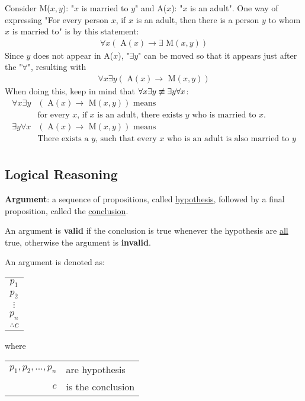 \documentclass{article}
\begin{document}
Consider M($x, y$): "$x$ is married to $y$" and A($x$): "$x$ is an adult".
One way of expressing "For every person $x$, if $x$ is an adult, then
there is a person $y$ to whom $x$ is married to" is by this statement:
\begin{align*}
  \forall x (\text{ A}(x) \rightarrow \exists \text{ M}(x, y))
\end{align*}
Since $y$ does not appear in A($x$), "\(\exists y\)" can be moved so that it appears
just after the "\(\forall\)", resulting with
\begin{align*}
  \forall x \exists y (\text{ A}(x) \rightarrow \text{ M}(x, y))
\end{align*}
When doing this, keep in mind that \(\forall x \exists y \centernot \equiv \exists y \forall x\):
\begin{align*}
  \forall x \exists y & (\text{ A}(x) \rightarrow \text{ M}(x, y)) \text{ means}                              \\
                      & \text{for every $x$, if $x$ is an adult, there exists $y$ who is married to $x$.}     \\
  \exists y \forall x & (\text{ A}(x) \rightarrow \text{ M}(x, y)) \text{ means}                              \\
                      & \text{There exists a $y$, such that every $x$ who is an adult is also married to $y$} \\
\end{align*}

\subsection{Logical Reasoning}

\textbf{Argument}: a sequence of propositions, called \underline{hypothesis}, followed
by a final proposition, called the \underline{conclusion}.

An argument is \textbf{valid} if the conclusion is true whenever the hypothesis
are \underline{all} true, otherwise the argument is \textbf{invalid}.

\begin{center}
  An argument is denoted as:
  \begin{tabular}{c}
    \(p_1\)     \\
    \(p_2\)     \\
    \(\vdots \) \\
    \(p_n\)     \\
    \hline
    \(\therefore c\)
  \end{tabular}
  \quad where \quad
  \begin{tabular}{rl}
    \(p_1, p_2, \ldots, p_n\) & are hypothesis    \\
    \(c\)                     & is the conclusion
  \end{tabular}
\end{center}
\end{document}
